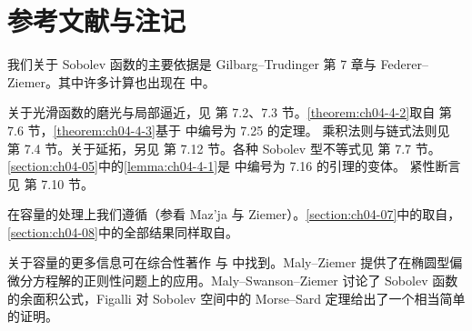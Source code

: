 \documentclass[../../main.tex]{subfiles}%
\begin{document}
\section{参考文献与注记}\label{section:ch04-10}

我们关于 Sobolev 函数的主要依据是 Gilbarg--Trudinger\cite{gilbarg1983} 第 7 章与 Federer--Ziemer\cite{federer1972}。其中许多计算也出现在\cite{evans2010} 中。

关于光滑函数的磨光与局部逼近，见\cite{gilbarg1983} 第 7.2、7.3 节。\cref{theorem:ch04-4-2}取自\cite{gilbarg1983} 第 7.6 节，\cref{theorem:ch04-4-3}基于\cite{gilbarg1983} 中编号为 7.25 的定理。%
乘积法则与链式法则见\cite{gilbarg1983} 第 7.4 节。关于延拓，另见\cite{gilbarg1983} 第 7.12 节。各种 Sobolev 型不等式见\cite{gilbarg1983} 第 7.7 节。\cref{section:ch04-05}中的\cref{lemma:ch04-4-1}是\cite{gilbarg1983} 中编号为 7.16 的引理的变体。%
紧性断言见\cite{gilbarg1983} 第 7.10 节。

在容量的处理上我们遵循\cite{federer1972}（参看 Maz'ja\cite{mazja1985} 与 Ziemer\cite{ziemer1989}）。\cref{section:ch04-07}中的取自\cite{federer1972}，\cref{section:ch04-08}中的全部结果同样取自\cite{federer1972}。%

关于容量的更多信息可在综合性著作\cite{ziemer1989} 与\cite{mazja1985} 中找到。Maly--Ziemer\cite{maly1997} 提供了在椭圆型偏微分方程解的正则性问题上的应用。Maly--Swanson--Ziemer\cite{maly2003} 讨论了 Sobolev 函数的余面积公式，Figalli\cite{figalli2008} 对 Sobolev 空间中的 Morse--Sard 定理给出了一个相当简单的证明。
\end{document}
